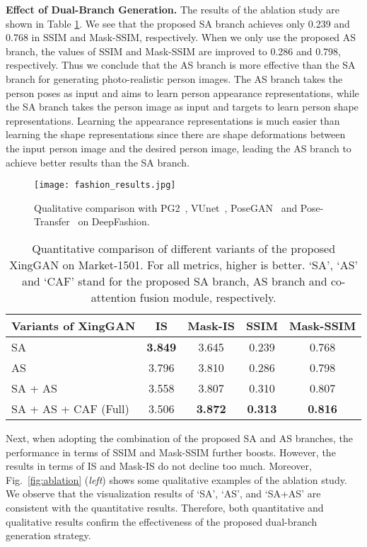 \documentclass[runningheads]{llncs}
\begin{document}
\noindent \textbf{Effect of Dual-Branch Generation.}
The results of the ablation study are shown in Table \ref{tab:abla}. 
We see that the proposed SA branch achieves only 0.239 and 0.768 in SSIM and Mask-SSIM, respectively.
When we only use the proposed AS branch, the values of SSIM and Mask-SSIM are improved to 0.286 and 0.798, respectively.
Thus we conclude that the AS branch is more effective than the SA branch for generating photo-realistic person images.
The AS branch takes the person poses as input and aims to learn person appearance representations, while the SA branch takes the person image as input and targets to learn person shape representations.
Learning the appearance representations is much easier than learning the shape representations since there are shape deformations between the input person image and the desired person image, leading the AS branch to achieve better results than the SA branch.

\begin{figure}[!t]
	\centering
	\texttt{[image: fashion\_results.jpg]}
	\caption{Qualitative comparison with PG2~\cite{ma2017pose}, VUnet~\cite{esser2018variational}, PoseGAN~\cite{siarohin2018deformable} and Pose-Transfer~\cite{zhu2019progressive} on DeepFashion.}
	\label{fig:fashion_result}
\end{figure}

\begin{table}[!t]
	\centering
	\caption{Quantitative comparison of different variants of the proposed XingGAN on Market-1501. For all metrics, higher is better. `SA', `AS' and `CAF' stand for the proposed SA branch, AS branch and co-attention fusion module, respectively.}
		\begin{tabular}{lcccc} \toprule
			Variants of XingGAN & IS & Mask-IS & SSIM & Mask-SSIM    \\ \hline	
			SA & \textbf{3.849} & 3.645 & 0.239 & 0.768 \\ 
			AS & 3.796 & 3.810 & 0.286 & 0.798 \\
			SA + AS & 3.558 & 3.807 & 0.310 & 0.807 \\
			SA + AS + CAF (Full)       & 3.506 & \textbf{3.872} & \textbf{0.313} & \textbf{0.816} \\
			\bottomrule	
	\end{tabular}
	\label{tab:abla}
\end{table}

Next, when adopting the combination of the proposed SA and AS branches, the performance in terms of SSIM and Mask-SSIM further boosts.
However, the results in terms of IS and Mask-IS do not decline too much.
Moreover, Fig.~\ref{fig:ablation} (\textit{left}) shows some qualitative examples of the ablation study.
We observe that the visualization results of `SA', `AS', and `SA+AS' are consistent with the quantitative results.
Therefore, both quantitative and qualitative results confirm the effectiveness of the proposed dual-branch generation strategy.
\end{document}
